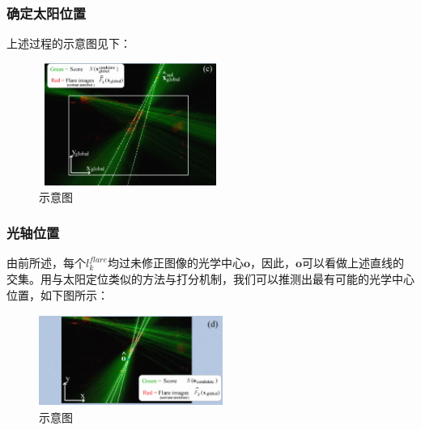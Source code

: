 \documentclass{beamer}
\begin{document}
\begin{frame}
\frametitle{确定太阳位置}
上述过程的示意图见下：
\begin{figure}[!h]
\centering
\includegraphics[height=4cm,width=6cm]{2022120505.png}
\caption{示意图}
\end{figure}
\end{frame}
\begin{frame}
\frametitle{光轴位置}
由前所述，每个$l_k^{flare}$均过未修正图像的光学中心$\textbf{o}$，因此，$\textbf{o}$可以看做上述直线的交集。用与太阳定位类似的方法与打分机制，我们可以推测出最有可能的光学中心位置，如下图所示：
\begin{figure}[!h]
\centering
\includegraphics[height=3cm,width=6cm]{2022120506.png}
\caption{示意图}
\end{figure}
\end{frame}
\end{document}
